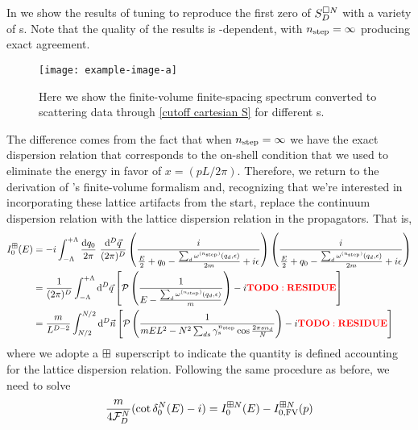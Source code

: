 In  we show the results of tuning to reproduce the first zero of $S_D^{\square N}$ with a variety of {\nstep}s.
Note that the quality of the results is \nstep-dependent, with ${n_\text{step}}=\infty$ producing exact agreement.

\begin{figure}
    \texttt{[image: example-image-a]}
    \caption{Here we show the finite-volume finite-spacing spectrum converted to scattering data through \eqref{cutoff cartesian S} for different {\nstep}s.
    }
    \label{fig:results cutoff cartesian S}
\end{figure}

The difference comes from the fact that when ${n_\text{step}}=\infty$ we have the exact dispersion relation that corresponds to the on-shell condition that we used to eliminate the energy in favor of $x=(pL/2\pi)$.
Therefore, we return to the derivation of \Luscher's finite-volume formalism and, recognizing that we're interested in incorporating these lattice artifacts from the start, replace the continuum dispersion relation with the lattice dispersion relation in the propagators.
That is,
\begin{align}
    I_0^{\boxplus}(E)
    &=-i\int_{-\Lambda}^{+\Lambda}
        \frac{ \mathrm {d}q_0}{2\pi}\
        \frac{\mathrm{d}^{D} \vec{q} } { (2\pi)^ { D } }
        \left( \frac { i } { \frac{E}{2} + q_{ 0 } - \frac{\sum_d \omega^{({n_\text{step}})}(q_d,\epsilon)}{2m} + i \epsilon } \right)
        \left( \frac { i } { \frac{E}{2} + q_{ 0 } - \frac{\sum_d \omega^{({n_\text{step}})}(q_d,\epsilon)}{2m} + i \epsilon } \right)
    \nonumber\\
    &=\frac{1}{(2\pi)^D}
    \int_{-\Lambda}^{+\Lambda}
        \mathrm{d}^D \vec{q}
        \left[
            \mathcal{P} \left( \frac { 1 } { E - \frac{\sum_d \omega^{({n_\text{step}})}(q_d,\epsilon)}{m} } \right)
            -i {\bf\color{red}TODO: RESIDUE}
        \right]
    \\
    &=\frac{m}{L^{D-2}}
    \int_{N/2}^{N/2}
        \mathrm{d}^D\vec{n}
        \left[
            \mathcal{P} \left( \frac { 1 } { m E L^2 - N^2 \sum_{ds} \gamma_s^{{n_\text{step}}} \cos \frac{2\pi s n_d}{N}} \right)
            -i {\bf\color{red}TODO: RESIDUE}
        \right]
    \label{eq:dispersion I0}
\end{align}
where we adopte a $\boxplus$ superscript to indicate the quantity is defined accounting for the lattice dispersion relation.
Following the same procedure as before, we need to solve
\begin{equation}
    \frac{m}{4\mathcal{F}_D^N}(\cot \delta_0^N(E) - i) = I_0^{\boxplus N}(E) - I_{0,\textrm{FV}}^{\boxplus N}(p)
\end{equation}

